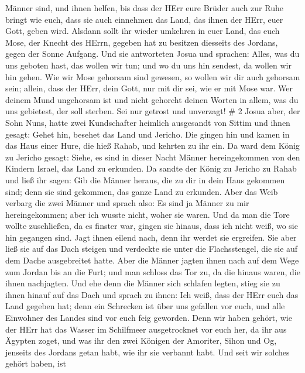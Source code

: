 Männer sind, und ihnen helfen,  bis dass der HErr eure
Brüder auch zur Ruhe bringt wie euch, dass sie auch einnehmen das Land,
das ihnen der HErr, euer Gott, geben wird. Alsdann sollt ihr wieder
umkehren in euer Land, das euch Mose, der Knecht des HErrn, gegeben hat
zu besitzen diesseits des Jordans, gegen der Sonne Aufgang.
 Und sie antworteten Josua und sprachen: Alles, was du uns
geboten hast, das wollen wir tun; und wo du uns hin sendest, da wollen
wir hin gehen.  Wie wir Mose gehorsam sind gewesen, so
wollen wir dir auch gehorsam sein; allein, dass der HErr, dein Gott, nur
mit dir sei, wie er mit Mose war.  Wer deinem Mund
ungehorsam ist und nicht gehorcht deinen Worten in allem, was du uns
gebietest, der soll sterben. Sei nur getrost und unverzagt! \# 2
 Josua aber, der Sohn Nuns, hatte zwei Kundschafter heimlich
ausgesandt von Sittim und ihnen gesagt: Gehet hin, besehet das Land und
Jericho. Die gingen hin und kamen in das Haus einer Hure, die hieß
Rahab, und kehrten zu ihr ein.  Da ward dem König zu Jericho
gesagt: Siehe, es sind in dieser Nacht Männer hereingekommen von den
Kindern Israel, das Land zu erkunden.  Da sandte der König
zu Jericho zu Rahab und ließ ihr sagen: Gib die Männer heraus, die zu
dir in dein Haus gekommen sind; denn sie sind gekommen, das ganze Land
zu erkunden.  Aber das Weib verbarg die zwei Männer und
sprach also: Es sind ja Männer zu mir hereingekommen; aber ich wusste
nicht, woher sie waren.  Und da man die Tore wollte
zuschließen, da es finster war, gingen sie hinaus, dass ich nicht weiß,
wo sie hin gegangen sind. Jagt ihnen eilend nach, denn ihr werdet sie
ergreifen.  Sie aber ließ sie auf das Dach steigen und
verdeckte sie unter die Flachsstengel, die sie auf dem Dache
ausgebreitet hatte.  Aber die Männer jagten ihnen nach auf
dem Wege zum Jordan bis an die Furt; und man schloss das Tor zu, da die
hinaus waren, die ihnen nachjagten.  Und ehe denn die Männer
sich schlafen legten, stieg sie zu ihnen hinauf auf das Dach
 und sprach zu ihnen: Ich weiß, dass der HErr euch das Land
gegeben hat; denn ein Schrecken ist über uns gefallen vor euch, und alle
Einwohner des Landes sind vor euch feig geworden.  Denn wir
haben gehört, wie der HErr hat das Wasser im Schilfmeer ausgetrocknet
vor euch her, da ihr aus Ägypten zoget, und was ihr den zwei Königen der
Amoriter, Sihon und Og, jenseits des Jordans getan habt, wie ihr sie
verbannt habt.  Und seit wir solches gehört haben, ist
